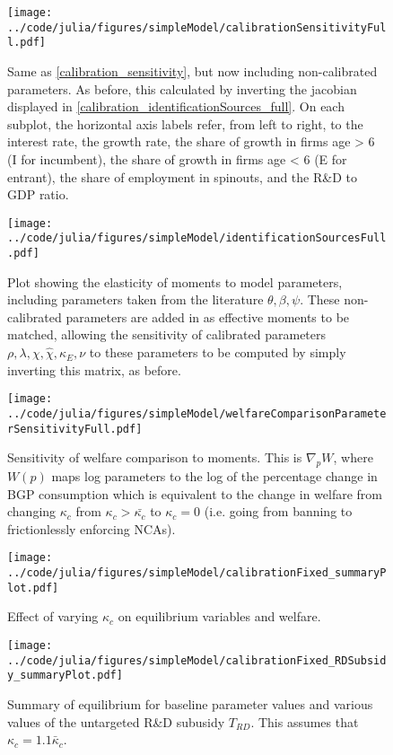 \documentclass[11pt,english]{article}
\theoremstyle{definition}
\begin{document}
\begin{figure}[]
	\centering
	\texttt{[image: ../code/julia/figures/simpleModel/calibrationSensitivityFull.pdf]}
	\caption{Same as \autoref{calibration_sensitivity}, but now including non-calibrated parameters. As before, this calculated by inverting the jacobian displayed in \autoref{calibration_identificationSources_full}. On each subplot, the horizontal axis labels refer, from left to right, to the interest rate, the growth rate, the share of growth in firms age > 6 (I for incumbent), the share of growth in firms age < 6 (E for entrant), the share of employment in spinouts, and the R\&D to GDP ratio.}
	\label{calibration_sensitivity_full}
\end{figure}

\begin{figure}[]
	\centering
	\texttt{[image: ../code/julia/figures/simpleModel/identificationSourcesFull.pdf]}
	\caption{Plot showing the elasticity of moments to model parameters, including parameters taken from the literature $\theta , \beta, \psi$. These non-calibrated parameters are added in as effective moments to be matched, allowing the sensitivity of calibrated parameters $\rho, \lambda, \chi, \hat{\chi}, \kappa_E, \nu$ to these parameters to be computed by simply inverting this matrix, as before.}
	\label{calibration_identificationSources_full}
\end{figure}

\begin{figure}[]
	\centering
	\texttt{[image: ../code/julia/figures/simpleModel/welfareComparisonParameterSensitivityFull.pdf]}
	\caption{Sensitivity of welfare comparison to moments. This is $\nabla_p W$, where $W(p)$ maps log parameters to the log of the percentage change in BGP consumption which is equivalent to the change in welfare from changing $\kappa_c$ from $\kappa_c > \bar{\kappa_c}$ to $\kappa_c = 0$ (i.e. going from banning to frictionlessly enforcing NCAs).}
	\label{welfareComparisonParameterSensitivityFull}
\end{figure}

\begin{figure}[]
	\centering
	\texttt{[image: ../code/julia/figures/simpleModel/calibrationFixed\_summaryPlot.pdf]}
	\caption{Effect of varying $\kappa_c$ on equilibrium variables and welfare.}
	\label{calibration_summaryPlot}
\end{figure}

\begin{figure}[]
	\centering
	\texttt{[image: ../code/julia/figures/simpleModel/calibrationFixed\_RDSubsidy\_summaryPlot.pdf]}
	\caption{Summary of equilibrium for baseline parameter values and various values of the untargeted R\&D subusidy $T_{RD}$. This assumes that $\kappa_c = 1.1 \bar{\kappa}_c$.}
	\label{calibration_RDSubsidy_summaryPlot}
\end{figure}
\end{document}
